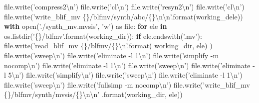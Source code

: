 \documentclass[]{book}
\newenvironment{Shaded}{\begin{snugshade}}{\end{snugshade}}
\newcommand{\BuiltInTok}[1]{#1}
\newcommand{\CharTok}[1]{\textcolor[rgb]{0.31,0.60,0.02}{#1}}
\newcommand{\ControlFlowTok}[1]{\textcolor[rgb]{0.13,0.29,0.53}{\textbf{#1}}}
\newcommand{\ImportTok}[1]{#1}
\newcommand{\KeywordTok}[1]{\textcolor[rgb]{0.13,0.29,0.53}{\textbf{#1}}}
\newcommand{\NormalTok}[1]{#1}
\newcommand{\SpecialCharTok}[1]{\textcolor[rgb]{0.00,0.00,0.00}{#1}}
\newcommand{\StringTok}[1]{\textcolor[rgb]{0.31,0.60,0.02}{#1}}
\begin{document}
\begin{Shaded}
\begin{Highlighting}[]
        \BuiltInTok{file}\NormalTok{.write(}\StringTok{'compress2}\CharTok{\textbackslash{}n}\StringTok{'}\NormalTok{)}
        \BuiltInTok{file}\NormalTok{.write(}\StringTok{'cl}\CharTok{\textbackslash{}n}\StringTok{'}\NormalTok{)}
        \BuiltInTok{file}\NormalTok{.write(}\StringTok{'resyn2}\CharTok{\textbackslash{}n}\StringTok{'}\NormalTok{)}
        \BuiltInTok{file}\NormalTok{.write(}\StringTok{'cl}\CharTok{\textbackslash{}n}\StringTok{'}\NormalTok{)}
        \BuiltInTok{file}\NormalTok{.write(}\StringTok{'write_blif_mv }\SpecialCharTok{\{\}}\StringTok{/blfmv/synth/abc/}\SpecialCharTok{\{\}}\CharTok{\textbackslash{}n\textbackslash{}n}\StringTok{'}\NormalTok{.}\BuiltInTok{format}\NormalTok{(working_dele))}
  \ControlFlowTok{with} \BuiltInTok{open}\NormalTok{(}\StringTok{'./synth_mv.mvsis'}\NormalTok{, }\StringTok{'w'}\NormalTok{) }\ImportTok{as} \BuiltInTok{file}\NormalTok{:}
    \ControlFlowTok{for}\NormalTok{ ele }\KeywordTok{in}\NormalTok{ os.listdir(}\StringTok{'}\SpecialCharTok{\{\}}\StringTok{/blfmv'}\NormalTok{.}\BuiltInTok{format}\NormalTok{(working_dir)):}
      \ControlFlowTok{if}\NormalTok{ ele.endswith(}\StringTok{'.mv'}\NormalTok{):}
        \BuiltInTok{file}\NormalTok{.write(}\StringTok{'read_blif_mv }\SpecialCharTok{\{\}}\StringTok{/blfmv/}\SpecialCharTok{\{\}}\CharTok{\textbackslash{}n}\StringTok{'}\NormalTok{.}\BuiltInTok{format}\NormalTok{(}
\NormalTok{          working_dir, ele)}
\NormalTok{        )}
        \BuiltInTok{file}\NormalTok{.write(}\StringTok{'sweep}\CharTok{\textbackslash{}n}\StringTok{'}\NormalTok{)}
        \BuiltInTok{file}\NormalTok{.write(}\StringTok{'eliminate -l 1}\CharTok{\textbackslash{}n}\StringTok{'}\NormalTok{)}
        \BuiltInTok{file}\NormalTok{.write(}\StringTok{'simplify -m nocomp}\CharTok{\textbackslash{}n}\StringTok{'}\NormalTok{)}
        \BuiltInTok{file}\NormalTok{.write(}\StringTok{'eliminate -l 1}\CharTok{\textbackslash{}n}\StringTok{'}\NormalTok{)}
        \BuiltInTok{file}\NormalTok{.write(}\StringTok{'sweep}\CharTok{\textbackslash{}n}\StringTok{'}\NormalTok{)}
        \BuiltInTok{file}\NormalTok{.write(}\StringTok{'eliminate -l 5}\CharTok{\textbackslash{}n}\StringTok{'}\NormalTok{)}
        \BuiltInTok{file}\NormalTok{.write(}\StringTok{'simplify}\CharTok{\textbackslash{}n}\StringTok{'}\NormalTok{)}
        \BuiltInTok{file}\NormalTok{.write(}\StringTok{'sweep}\CharTok{\textbackslash{}n}\StringTok{'}\NormalTok{)}
        \BuiltInTok{file}\NormalTok{.write(}\StringTok{'eliminate -l 1}\CharTok{\textbackslash{}n}\StringTok{'}\NormalTok{)}
        \BuiltInTok{file}\NormalTok{.write(}\StringTok{'sweep}\CharTok{\textbackslash{}n}\StringTok{'}\NormalTok{)}
        \BuiltInTok{file}\NormalTok{.write(}\StringTok{'fullsimp -m nocomp}\CharTok{\textbackslash{}n}\StringTok{'}\NormalTok{)}
        \BuiltInTok{file}\NormalTok{.write(}\StringTok{'write_blif_mv }\SpecialCharTok{\{\}}\StringTok{/blfmv/synth/mvsis/}\SpecialCharTok{\{\}}\CharTok{\textbackslash{}n\textbackslash{}n}\StringTok{'}
\NormalTok{          .}\BuiltInTok{format}\NormalTok{(working_dir, ele))}
\end{Highlighting}
\end{Shaded}
\end{document}
